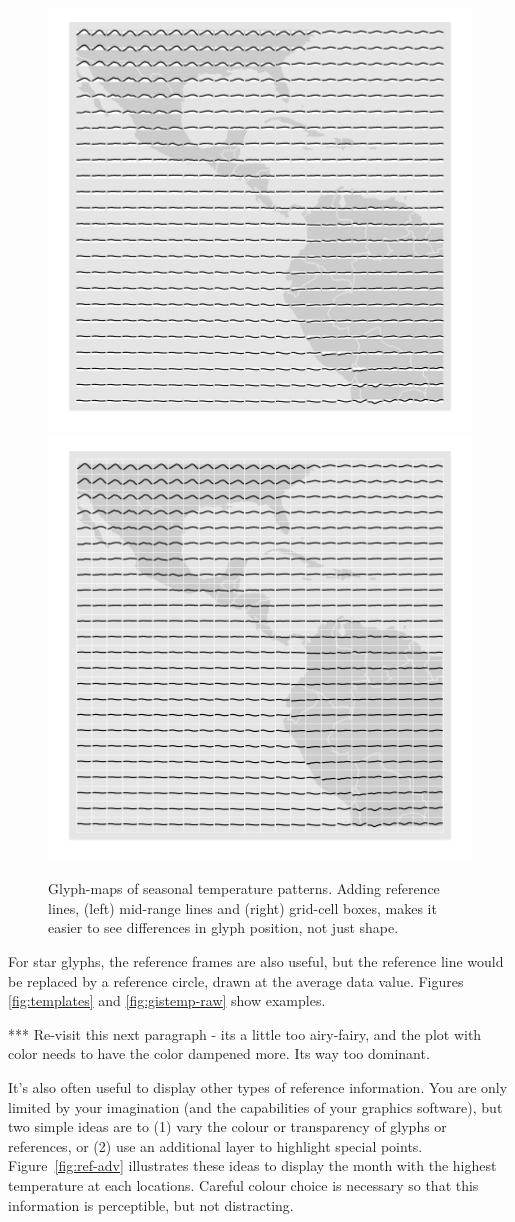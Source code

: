 \documentclass[oneside]{article}
\begin{document}
\begin{figure}[htbp]
  \centering
  \includegraphics[width=0.5\linewidth]{ref-line}%
  \includegraphics[width=0.5\linewidth]{ref-box}

  \caption{Glyph-maps of seasonal temperature patterns. Adding reference lines, (left) mid-range lines and (right) grid-cell boxes, makes it easier to see differences in glyph position, not just shape.}
  \label{fig:ref-basic}
\end{figure}

For star glyphs, the reference frames are also useful, but the reference line would be replaced by a reference circle, drawn at the average data value. Figures \ref{fig:templates} and \ref{fig:gistemp-raw} show examples.

*** Re-visit this next paragraph - its a little too airy-fairy, and the plot with color needs to have the color dampened more. Its way too dominant.

It's also often useful to display other types of reference information. You are only limited by your imagination (and the capabilities of your graphics software), but two simple ideas are to (1) vary the colour or transparency of glyphs or references, or (2) use an additional layer to highlight special points. Figure~\ref{fig:ref-adv} illustrates these ideas to display the month with the highest temperature at each locations. Careful colour choice is necessary so that this information is perceptible, but not distracting.
\end{document}
